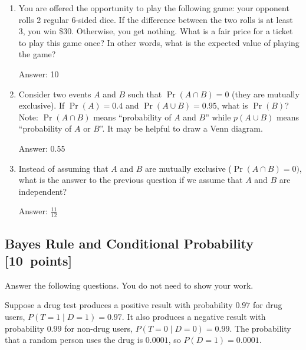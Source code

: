 \documentclass{article}
\newcommand{\blu}[1]{{\textcolor{blu}{#1}}}
\newenvironment{answer}{\par\begingroup\color{gre}Answer: }{\endgroup}
\let\ask\blu
\newcommand\pts[1]{\textcolor{pointscolour}{[#1~points]}}
\begin{document}
  \begin{enumerate}
  \item You are offered the opportunity to play the following game: your opponent rolls 2 regular 6-sided dice. If the difference between the two rolls is at least 3, you win \$30. Otherwise, you get nothing. What is a fair price for a ticket to play this game once? In other words, what is the expected value of playing the game?
  \begin{answer}
    10
  \end{answer}
  \item Consider two events $A$ and $B$ such that $\Pr(A \cap B)=0$ (they are mutually exclusive). If $\Pr(A) = 0.4$ and $\Pr(A \cup B) = 0.95$, what is $\Pr(B)$? Note: $\Pr(A \cap B)$ means
  ``probability of $A$ and $B$'' while $p(A \cup B)$ means ``probability of $A$ or $B$''. It may be helpful to draw a Venn diagram.
  \begin{answer}
    0.55
  \end{answer}
  \item Instead of assuming that $A$ and $B$ are mutually exclusive ($\Pr(A \cap B) = 0)$, what is the answer to the previous question if we assume that $A$ and $B$ are independent?
  \begin{answer}
   $\frac{11}{12}$
  \end{answer}

  \end{enumerate}

  \subsection{Bayes Rule and Conditional Probability \pts{10}}

  \ask{Answer the following questions.} You do not need to show your work.

  Suppose a drug test produces a positive result with probability $0.97$ for drug users, $P(T=1 \mid D=1)=0.97$. It also produces a negative result with probability $0.99$ for non-drug users, $P(T=0 \mid D=0)=0.99$. The probability that a random person uses the drug is $0.0001$, so $P(D=1)=0.0001$.
\end{document}
